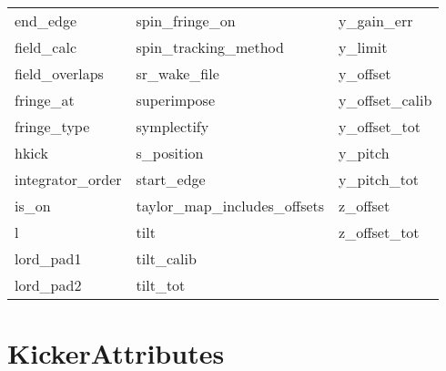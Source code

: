 \begin{tabular}{lll}
end_edge                    & spin_fringe_on              & y_gain_err                  \\
field_calc                  & spin_tracking_method        & y_limit                     \\
field_overlaps              & sr_wake_file                & y_offset                    \\
fringe_at                   & superimpose                 & y_offset_calib              \\
fringe_type                 & symplectify                 & y_offset_tot                \\
hkick                       & s_position                  & y_pitch                     \\
integrator_order            & start_edge                  & y_pitch_tot                 \\
is_on                       & taylor_map_includes_offsets & z_offset                    \\
l                           & tilt                        & z_offset_tot                \\
lord_pad1                   & tilt_calib                  &                             \\
lord_pad2                   & tilt_tot                    &                             \\
 \bottomrule
 \end{tabular}
 \vfill
 
 \section{KickerAttributes}
 \label{s:list.kicker}
 
